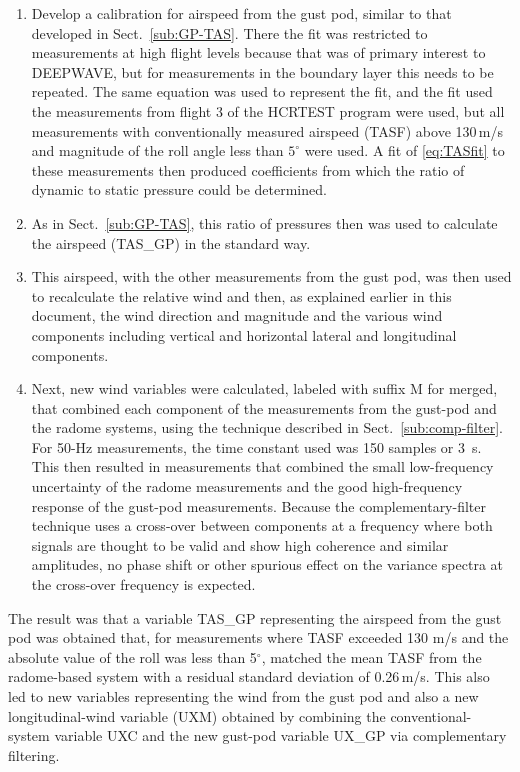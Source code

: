 \documentclass[12pt,twoside,english]{article}\usepackage[]{graphicx}\usepackage[]{color}
\let\OrgIndex\index
\renewcommand*{\index}[1]{\OrgIndex{#1}}
\begin{document}
\begin{enumerate}
\item Develop a calibration for airspeed from the gust pod, similar to that developed in Sect.~\ref{sub:GP-TAS}. There the fit was restricted to measurements at high flight levels because that was of primary interest to DEEPWAVE, but for measurements in the boundary layer this needs to be repeated. The same equation was used to represent the fit, and the fit used the measurements from flight 3 of the HCRTEST program were used, but all measurements with conventionally measured airspeed (TASF) above 130\,m/s and magnitude of the roll angle less than $5^{\circ}$ were used. A fit of \eqref{eq:TASfit} to these measurements then produced coefficients from which the ratio of dynamic to static pressure could be determined. 
\item As in Sect.~\ref{sub:GP-TAS}, this ratio of pressures then was used to calculate the airspeed (TAS\_GP) in the standard way. 
\item This airspeed, with the other measurements from the gust pod, was then used to recalculate the relative wind and then, as explained earlier in this document, the wind direction and magnitude and the various wind components including vertical and horizontal lateral and longitudinal components. 
\item Next, new wind variables were calculated, labeled with suffix \textquotedbl{}M\textquotedbl{} for \textquotedbl{}merged\textquotedbl{}, that combined each component of the measurements from the gust-pod and the radome systems, using the technique described in Sect.~\ref{sub:comp-filter}. For 50-Hz measurements, the time constant used was 150 samples or 3~s. This then resulted in measurements that combined the small low-frequency uncertainty of the radome measurements and the good high-frequency response of the gust-pod measurements. Because the complementary-filter technique uses a cross-over between components at a frequency where both signals are thought to be valid and show high coherence and similar amplitudes, no phase shift or other spurious effect on the variance spectra at the cross-over frequency is expected. 
\end{enumerate}

The result was that a variable TAS\_GP representing the airspeed from the gust pod was obtained that, for measurements where TASF exceeded 130 m/s and the absolute value of the roll was less than 5$^{\circ}$, matched the mean TASF from the radome-based system with a residual standard deviation of 0.26\,m/s. This also led to new variables representing the wind from the gust pod and also a new longitudinal-wind variable (UXM) obtained by combining the conventional-system variable UXC and the new gust-pod variable UX\_GP via complementary filtering. 
\end{document}

